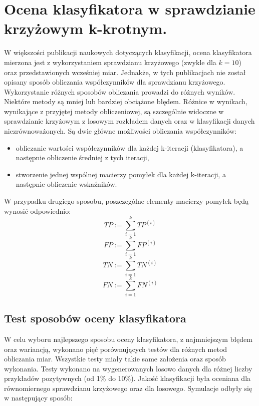 \section{Ocena klasyfikatora w sprawdzianie krzyżowym k-krotnym.}
W większości publikacji naukowych dotyczących klasyfikacji, ocena klasyfikatora mierzona jest z wykorzystaniem sprawdzianu krzyżowego (zwykle dla $k=10$) oraz przedstawionych wcześniej miar. Jednakże, w tych publikacjach nie został opisany sposób obliczania współczynników dla sprawdzianu krzyżowego. Wykorzystanie różnych sposobów obliczania prowadzi do różnych wyników. Niektóre metody są mniej lub bardziej obciążone błędem. Różnice w wynikach, wynikające z przyjętej metody obliczeniowej, są szczególnie widoczne w sprawdzianie krzyżowym z losowym rozkładem danych oraz w klasyfikacji danych niezrównoważonych. Są dwie główne możliwości obliczania współczynników:
\begin{itemize}
	\item obliczanie wartości współczynników dla każdej k-iteracji (klasyfikatora), a następnie obliczenie średniej z tych iteracji,
	\item stworzenie jednej wspólnej macierzy pomyłek dla każdej k-iteracji, a następnie obliczenie wskaźników.
\end{itemize}
W przypadku drugiego sposobu, poszczególne elementy macierzy pomyłek będą wynosić odpowiednio:
\[TP := \sum_{i=1}^{k} TP^{(i)}\]
\[FP := \sum_{i=1}^{k} FP^{(i)}\]
\[TN := \sum_{i=1}^{k} TN^{(i)}\]
\[FN := \sum_{i=1}^{k} FN^{(i)}\]
\subsection{Test sposobów oceny klasyfikatora}
W celu wyboru najlepszego sposobu oceny klasyfikatora, z najmniejszym błędem oraz wariancją, wykonano pięć porównujących testów dla różnych metod obliczania miar. Wszystkie testy miały takie same założenia oraz sposób wykonania. Testy wykonano na wygenerowanych losowo danych dla różnej liczby przykładów pozytywnych (od 1\% do 10\%). Jakość klasyfikacji była oceniana dla równomiernego sprawdzianu krzyżowego oraz dla losowego. Symulacje odbyły się w następujący sposób:

